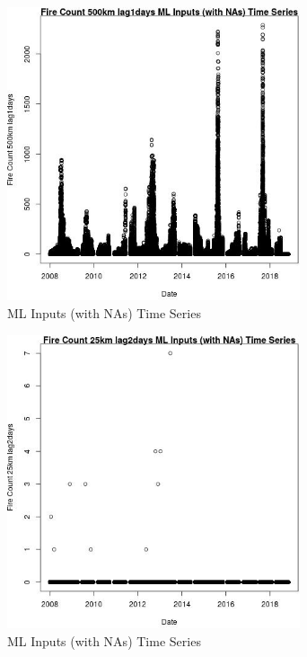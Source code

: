\begin{figure} 
\centering  
\includegraphics[width=0.77\textwidth]{Code_Outputs/Report_ML_input_PM25_Step4_part_e_de_duplicated_aves_compiled_2019-05-20wNAs_Fire_Count_500km_lag1daysvDate.jpg} 
\caption{\label{fig:Report_ML_input_PM25_Step4_part_e_de_duplicated_aves_compiled_2019-05-20wNAsFire_Count_500km_lag1daysvDate}ML Inputs (with NAs) Time Series} 
\end{figure} 
 

\begin{figure} 
\centering  
\includegraphics[width=0.77\textwidth]{Code_Outputs/Report_ML_input_PM25_Step4_part_e_de_duplicated_aves_compiled_2019-05-20wNAs_Fire_Count_25km_lag2daysvDate.jpg} 
\caption{\label{fig:Report_ML_input_PM25_Step4_part_e_de_duplicated_aves_compiled_2019-05-20wNAsFire_Count_25km_lag2daysvDate}ML Inputs (with NAs) Time Series} 
\end{figure} 
 

